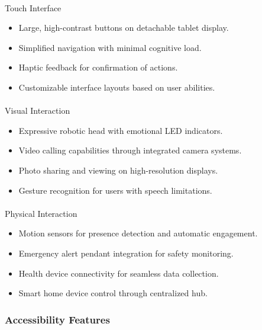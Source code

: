 \documentclass[
  letterpaper,
  DIV=11,
  numbers=noendperiod]{scrartcl}
\makeatletter
\let\oldparagraph\paragraph
\renewcommand{\paragraph}{
    \@ifstar
      \xxxParagraphStar
      \xxxParagraphNoStar
  }
\newcommand{\xxxParagraphStar}[1]{\oldparagraph*{#1}\mbox{}}
\newcommand{\xxxParagraphNoStar}[1]{\oldparagraph{#1}\mbox{}}
\providecommand{\tightlist}{%
  \setlength{\itemsep}{0pt}\setlength{\parskip}{0pt}}\usepackage{longtable,booktabs,array}
\makeatother
\begin{document}
\paragraph{Touch Interface}\label{touch-interface}

\begin{itemize}
\tightlist
\item
  Large, high-contrast buttons on detachable tablet display.
\item
  Simplified navigation with minimal cognitive load.
\item
  Haptic feedback for confirmation of actions.
\item
  Customizable interface layouts based on user abilities.
\end{itemize}

\paragraph{Visual Interaction}\label{visual-interaction}

\begin{itemize}
\tightlist
\item
  Expressive robotic head with emotional LED indicators.
\item
  Video calling capabilities through integrated camera systems.
\item
  Photo sharing and viewing on high-resolution displays.
\item
  Gesture recognition for users with speech limitations.
\end{itemize}

\paragraph{Physical Interaction}\label{physical-interaction}

\begin{itemize}
\tightlist
\item
  Motion sensors for presence detection and automatic engagement.
\item
  Emergency alert pendant integration for safety monitoring.
\item
  Health device connectivity for seamless data collection.
\item
  Smart home device control through centralized hub.
\end{itemize}

\subsubsection{Accessibility Features}\label{accessibility-features}
\end{document}
